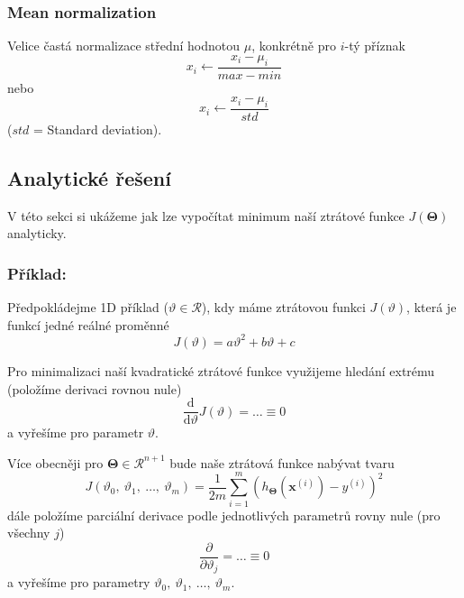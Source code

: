 \subsubsection*{Mean normalization}
\par{Velice častá normalizace střední hodnotou $\mu$, konkrétně pro $i$-tý příznak
\begin{equation}
	x_i \leftarrow \frac{x_i - \mu_i}{max - min}
\end{equation}
nebo
\begin{equation}
	x_i \leftarrow \frac{x_i - \mu_i}{std}
\end{equation}
($std$ = Standard deviation).

















\subsection{Analytické řešení}
\label{sec:normalEquation}

\par{V této sekci si ukážeme jak lze vypočítat minimum naší ztrátové funkce $J \left( \bm{\Theta} \right)$ analyticky.}

\subsubsection*{Příklad:}
\par{Předpokládejme 1D příklad ($\vartheta \in \mathcal{R}$), kdy máme ztrátovou funkci $J \left( \vartheta \right)$, která je funkcí jedné reálné proměnné
\begin{equation}
	J \left( \vartheta \right) = a \vartheta^2 + b \vartheta + c
\end{equation}}

\par{Pro minimalizaci naší kvadratické ztrátové funkce využijeme hledání extrému (položíme derivaci rovnou nule)
\begin{equation}
	\frac{\mathrm{d}}{\mathrm{d}\vartheta} J \left( \vartheta \right) = \ldots \equiv 0
\end{equation}
a vyřešíme pro parametr $\vartheta$.}

\par{Více obecněji pro $\bm{\Theta} \in \mathcal{R}^{n+1}$ bude naše ztrátová funkce nabývat tvaru
\begin{equation}
	J \left( \vartheta_0,~\vartheta_1,~\ldots,~\vartheta_m \right) = \frac{1}{2m} \sum_{i=1}^{m} \left( h_{\bm{\Theta}} \left( \bm{x}^{\left( i \right)} \right) - y^{\left( i \right)} \right)^2
\end{equation}
dále položíme parciální derivace podle jednotlivých parametrů rovny nule (pro všechny $j$)
\begin{equation}
	\frac{\partial}{\partial \vartheta_j} = \ldots \equiv 0
\end{equation}
a vyřešíme pro parametry $\vartheta_0,~\vartheta_1,~\ldots,~\vartheta_m$.}

}
